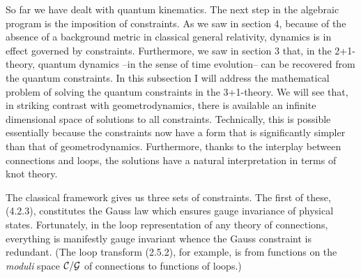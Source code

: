 So far we have dealt with quantum kinematics. The next step in the algebraic
program is the imposition of constraints. As we saw in section 4, because of
the absence of a background metric in classical general relativity, dynamics
is in effect governed by constraints. Furthermore, we saw in section 3 that,
in the 2+1-theory, quantum dynamics --in the sense of time evolution-- can
be recovered from the quantum constraints. In this subsection I will address
the mathematical problem of solving the quantum constraints in the 3+1-theory.
We will see that, in striking contrast with geometrodynamics, there is
available an infinite dimensional space of solutions to all constraints.
Technically, this is possible essentially because the constraints now have
a form that is significantly simpler than that of geometrodynamics.
Furthermore, thanks to the interplay between connections and loops, the
solutions have a natural interpretation in terms of knot theory.

The classical framework gives us three sets of constraints. The first of
these, (4.2.3), constitutes the Gauss law which ensures gauge invariance of
physical states. Fortunately, in the loop representation of any theory of
connections, everything is manifestly gauge invariant whence the Gauss
constraint is redundant. (The loop transform (2.5.2), for example, is from
functions on the {\it moduli} space ${\cal C}/{\cal G}$ of connections to
functions of loops.)


